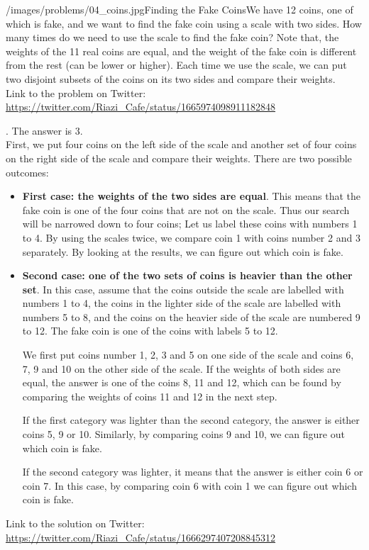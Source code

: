 \begin{problem}{/images/problems/04_coins.jpg}{Finding the Fake Coins}We have 12 coins, one of which is fake, and we want to find the fake coin using a scale with two sides. How many times do we need to use the scale to find the fake coin? Note that, the weights of the 11 real coins are equal, and the weight of the fake coin is different from the rest (can be lower or higher). Each time we use the scale, we can put two disjoint subsets of the coins on its two sides and compare their weights.\\[0.2cm]

Link to the problem on Twitter:  \url{https://twitter.com/Riazi_Cafe/status/1665974098911182848}\end{problem}
\begin{solution}.
The answer is 3.\\[0.2cm]

First, we put four coins on the left side of the scale and another set of four coins on the right side of the scale and compare their weights. There are two possible outcomes:

\begin{itemize}
\item \textbf{First case: the weights of the two sides are equal}. This means that the fake coin is one of the four coins that are not on the scale. Thus our search will be narrowed down to four coins; Let us label these coins with numbers 1 to 4. By using the scales twice, we compare coin 1 with coins number 2 and 3 separately. By looking at the results, we can figure out which coin is fake.

\item \textbf{Second case: one of the two sets of coins is heavier than the other set}. In this case, assume that the coins outside the scale are labelled with numbers 1 to 4, the coins in the lighter side of the scale are labelled with numbers 5 to 8, and the coins on the heavier side of the scale are numbered 9 to 12. The fake coin is one of the coins with labels 5 to 12.

We first put coins number 1, 2, 3 and 5 on one side of the scale and coins 6, 7, 9 and 10 on the other side of the scale. If the weights of both sides are equal, the answer is one of the coins 8, 11 and 12, which can be found by comparing the weights of coins 11 and 12 in the next step.

If the first category was lighter than the second category, the answer is either coins 5, 9 or 10. Similarly, by comparing coins 9 and 10, we can figure out which coin is fake.

If the second category was lighter, it means that the answer is either coin 6 or coin 7. In this case, by comparing coin 6 with coin 1 we can figure out which coin is fake.
\end{itemize}

Link to the solution on Twitter:  \url{https://twitter.com/Riazi_Cafe/status/1666297407208845312}\end{solution}
